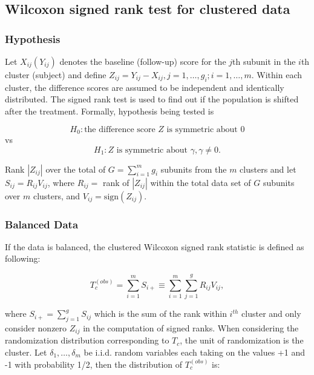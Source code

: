 \documentclass[nojss]{jss}\usepackage[]{graphicx}\usepackage[]{color}
\begin{document}
\subsection{Wilcoxon signed rank test for clustered data}
\label{sign}
\subsubsection{Hypothesis}
\label{hsign}
Let $X_{ij} (Y_{ij})$ denotes the baseline
(follow-up) score for the $j$th subunit
in the $i$th cluster (subject) and
define $Z_{ij} = Y_{ij} - X_{ij}, j = 1,
\ldots,g_i; i = 1,\ldots,m$.
Within each cluster, the difference
scores are assumed to be independent and
identically distributed. The signed rank
test is used to find out if the population
is shifted after the treatment.
Formally, hypothesis being tested is

\begin{equation*}
H_0: \text{the difference score } Z \text{ is symmetric about 0}
\end{equation*}
vs
\begin{equation*}
H_1: Z \text{ is symmetric about }\gamma, \gamma \not = 0.
\end{equation*}

Rank $|Z_{ij}|$ over the total of
$G = \sum_{i=1}^m g_i$ subunits from
the $m$ clusters and let $S_{ij}=R_{ij}V_{ij}$,
where $R_{ij} = $ rank of $|Z_{ij}|$
within the total data set of $G$
subunits over $m$ clusters, and $V_{ij} = \text{sign}(Z_{ij})$.


\subsubsection{Balanced Data}
\label{bsign}
If the data is balanced,
the clustered
Wilcoxon signed rank statistic is defined as following:

\begin{equation}
T_{c}^{(obs)} = \sum_{i=1}^mS_{i+} \equiv \sum^m_{i=1}\sum^g_{j=1}R_{ij}V_{ij},
\end{equation}


where $S_{i+} = \sum_{j=1}^gS_{ij}$ which
is the sum of the rank within $i^{th}$ cluster
and only consider nonzero
$Z_{ij}$ in the computation of signed ranks.
When considering the randomization
distribution corresponding to $T_c$,
the unit of randomization is the cluster.
Let $\delta_1, \ldots,\delta_m$ be i.i.d.
random variables each taking on the values
+1 and -1 with probability 1/2, then the
distribution of $T_{c}^{(obs)}$ is:
\end{document}
